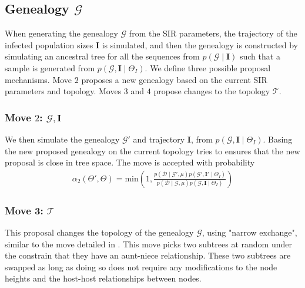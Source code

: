 \documentclass[]{report}
\begin{document}
\subsection{Genealogy $\mathcal{G}$} 

When generating the genealogy $\mathcal{G}$ from the SIR parameters, the trajectory of the infected population sizes $\mathbf{I}$ is simulated, and then the genealogy is constructed by simulating an ancestral tree for all the sequences from $p(\mathcal{G} \mid \mathbf{I})$  such that a sample is generated from $p(\mathcal{G}, \mathbf{I} \mid \Theta_{I})$.
We define three possible proposal mechanisms. Move $2$ proposes a new genealogy based on the current SIR parameters and topology. Moves $3$ and $4$ propose changes to the topology $\mathcal{T}$.

\subsubsection{Move $2$: $\mathcal{G}, \mathbf{I}$}
We then simulate the genealogy $\mathcal{G}'$ and trajectory $\mathbf{I}$, from  $p(\mathcal{G}, \mathbf{I} \mid \Theta_{I})$.  Basing the new proposed genealogy on the current topology tries to ensures that the new proposal is close in tree space. The move is accepted with probability 
\begin{eqnarray}
\alpha_{2}(\Theta',\Theta)=\textrm{min}\left(1,\frac{p(\mathcal{D}\mid \mathcal{G}', \mu) p(\mathcal{G}', \mathbf{I}' \mid \Theta_{I})}{p(\mathcal{D}\mid \mathcal{G}, \mu ) p(\mathcal{G}, \mathbf{I} \mid \Theta_{I})} \right)
\end{eqnarray}
\subsubsection{Move 3: $\mathcal{T}$}
This proposal changes the topology of the genealogy $\mathcal{G}$, using "narrow exchange", similar to the move detailed in \cite{Drummond:2002it}. This move picks two subtrees at random under the constrain that they have an aunt-niece relationship. These two subtrees are swapped as long as doing so does not require any modifications to the node heights and the host-host relationships between nodes. 
\end{document}
